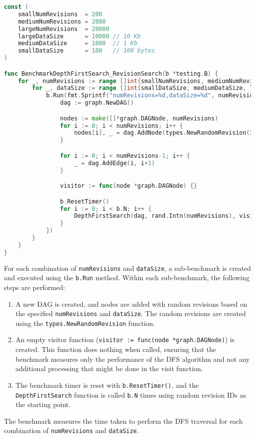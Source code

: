 \begin{lstlisting}[language=go]
const (
	smallNumRevisions  = 200
	mediumNumRevisions = 2000
	largeNumRevisions  = 20000
	largeDataSize      = 10000 // 10 Kb
	mediumDataSize     = 1000  // 1 Kb
	smallDataSize      = 100   // 100 bytes
)

func BenchmarkDepthFirstSearch_RevisionSearch(b *testing.B) {
	for _, numRevisions := range []int{smallNumRevisions, mediumNumRevisions, largeNumRevisions} {
		for _, dataSize := range []int{smallDataSize, mediumDataSize, largeDataSize} {
			b.Run(fmt.Sprintf("numRevisions=%d,dataSize=%d", numRevisions, dataSize), func(b *testing.B) {
				dag := graph.NewDAG()

				nodes := make([]*graph.DAGNode, numRevisions)
				for i := 0; i < numRevisions; i++ {
					nodes[i], _ = dag.AddNode(types.NewRandomRevision(i, dataSize))
				}

				for i := 0; i < numRevisions-1; i++ {
					_ = dag.AddEdge(i, i+1)
				}

				visitor := func(node *graph.DAGNode) {}

				b.ResetTimer()
				for i := 0; i < b.N; i++ {
					DepthFirstSearch(dag, rand.Intn(numRevisions), visitor)
				}
			})
		}
	}
}
\end{lstlisting}
\medskip

For each combination of \lstinline{numRevisions} and \lstinline{dataSize}, a sub-benchmark is created and executed using the \lstinline{b.Run} method. Within each sub-benchmark, the following steps are performed:
\begin{enumerate}
	\item A new DAG is created, and nodes are added with random revisions based on the specified \lstinline{numRevisions} and \lstinline{dataSize}. The random revisions are created using the \lstinline{types.NewRandomRevision} function.
	\item An empty visitor function (\lstinline{visitor := func(node *graph.DAGNode)}) is created. This function does nothing when called, ensuring that the benchmark measures only the performance of the DFS algorithm and not any additional processing that might be done in the visit function.
	\item The benchmark timer is reset with \lstinline{b.ResetTimer()}, and the \lstinline{DepthFirstSearch} function is called \lstinline{b.N} times using random revision IDs as the starting point.
\end{enumerate}
The benchmark measures the time taken to perform the DFS traversal for each combination of \lstinline{numRevisions} and \lstinline{dataSize}.

